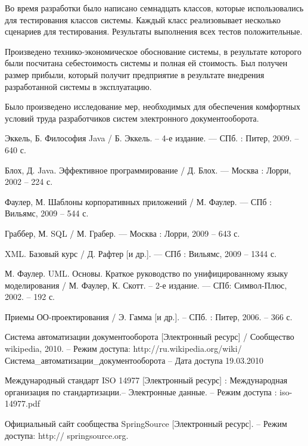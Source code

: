 \documentclass[14pt,a4paper]{reportmod}
\begin{document}
Во время разработки было написано семнадцать классов, которые использовались для тестирования классов системы. Каждый класс реализовывает несколько сценариев для тестирования. Результаты выполнения всех тестов положительные.

Произведено технико-экономическое обоснование системы, в результате которого были посчитана себестоимость системы и полная ей стоимость. Был получен размер прибыли, который получит предприятие в результате внедрения разработанной системы в эксплуатацию.

Было произведено исследование мер, необходимых для обеспечения комфортных условий труда разработчиков систем электронного документооборота.


\begin{thebibliography}{99}

 Эккель, Б. Философия Java / Б. Эккель. -- 4-е издание. --- СПб. : Питер, 2009. -- 640 с.

 Блох, Д. Java. Эффективное программирование / Д. Блох. --- Москва : Лорри, 2002 -- 224 с.

 Фаулер, М. Шаблоны корпоративных приложений / М. Фаулер. --- СПб : Вильямс, 2009 -- 544 с.

 Граббер, М. SQL / М. Грабер. --- Москва : Лорри, 2009 -- 643 с.

 XML. Базовый курс / Д. Рафтер [и др.]. --- СПб : Вильямс, 2009 -- 1344 с.

 М. Фаулер. UML. Основы. Краткое руководство по унифицированному языку моделирования / М. Фаулер, К. Скотт. -- 2-е издание. --- СПб: Символ-Плюс, 2002. -- 192 с.

 Приемы ОО-проектирования / Э. Гамма [и др.]. -- СПб. : Питер, 2006. -- 366 с.

 Система автоматизации документооборота [Электронный ресурс] / Сообщество wikipedia, 2010. -- Режим доступа: http://ru.wikipedia.org/wiki/Система\_автоматизации\_документооборота -- Дата доступа 19.03.2010

 Международный стандарт ISO 14977 [Электронный ресурс] : Международная организация по стандартизации.-- Электронные данные. -- Режим доступа : iso-14977.pdf

 Официальный сайт сообщества SpringSource  [Электронный ресурс]. -- Режим доступа: http:// springsource.org.


\end{thebibliography}
\end{document}
